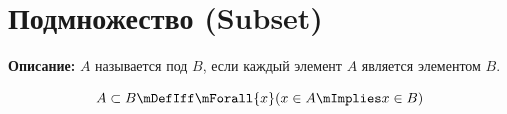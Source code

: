 
\section{Подмножество (Subset)}
\label{entity:obj-subset}

\textbf{Описание:}
 $A$ называется под  $B$, если каждый элемент $A$ является элементом $B$.

\hypertarget{obj-subset}{}
\hypertarget{obj-subset}{}
\begin{object}
\[
A \subset B \mDefIff \mForall{x} (x \in A \mImplies x \in B)
\]
\end{object}